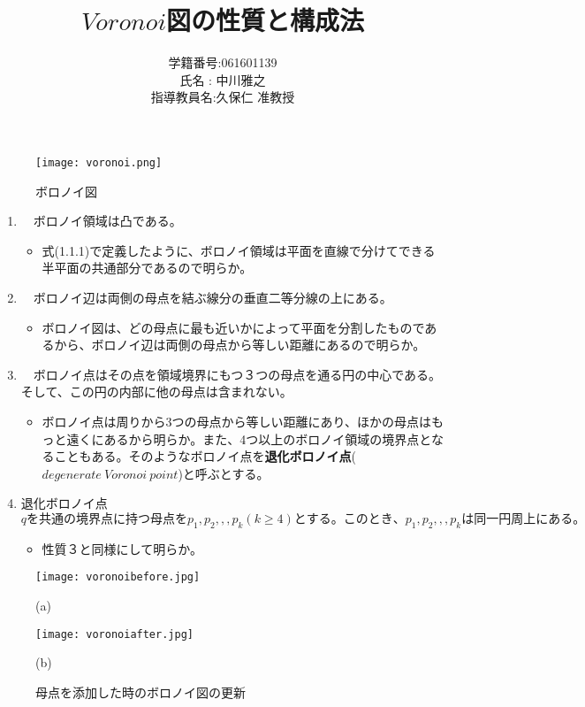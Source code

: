 \documentclass[10pt,a4paper,titlepage]{jsarticle}
\title{$Voronoi$図の性質と構成法}
\author{学籍番号:061601139\\
	氏名 : 中川雅之\\
	指導教員名:久保仁 准教授\\}
\begin{document}
\maketitle
\begin{figure}[b]
	\begin{center}
		\texttt{[image: voronoi.png]}
		\caption{ボロノイ図}
	\end{center}
\end{figure}



\begin{enumerate}[性質1]
	\item　ボロノイ領域は凸である。
		\begin{itemize}
		\item 式(1.1.1)で定義したように、ボロノイ領域は平面を直線で分けてできる半平面の共通部分であるので明らか。
		\end{itemize}
	\item　ボロノイ辺は両側の母点を結ぶ線分の垂直二等分線の上にある。
		\begin{itemize}
		\item ボロノイ図は、どの母点に最も近いかによって平面を分割したものであるから、ボロノイ辺は両側の母点から等しい距離にあるので明らか。
		\end{itemize}
	\item　ボロノイ点はその点を領域境界にもつ３つの母点を通る円の中心である。そして、この円の内部に他の母点は含まれない。
		\begin{itemize}
		\item ボロノイ点は周りから3つの母点から等しい距離にあり、ほかの母点はもっと遠くにあるから明らか。また、4つ以上のボロノイ領域の境界点となることもある。そのようなボロノイ点を{\bf 退化ボロノイ点}($degenerate~Voronoi~point$)と呼ぶとする。
		\end{itemize}
	\item 退化ボロノイ点$qを共通の境界点に持つ母点をp_1,p_2,,,p_k (k \geq 4)とする。このとき、p_1,p_2,,,p_kは同一円周上にある。$
		\begin{itemize}
		\item 性質３と同様にして明らか。
		\end{itemize}
\end{enumerate}







\begin{figure}[b]
	\centering
	\begin{minipage}{.4\textwidth}
		\texttt{[image: voronoibefore.jpg]}
		\caption{(a)}
	\end{minipage}
	\begin{minipage}{.4\textwidth}
		\texttt{[image: voronoiafter.jpg]}
		\caption{(b)}
	\end{minipage}
\caption{母点を添加した時のボロノイ図の更新}
\end{figure}
\end{document}
